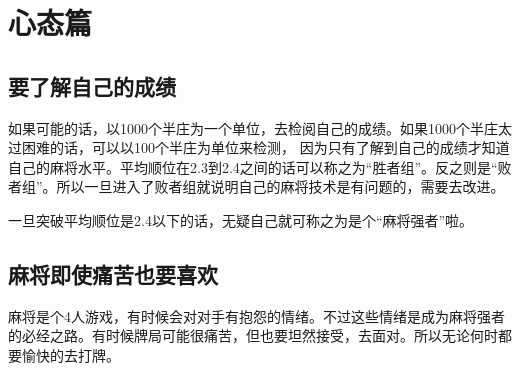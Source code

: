 \documentclass[小V的日麻笔记.tex]{subfiles}
\begin{document}
\chapter{心态篇}
\section{要了解自己的成绩}
如果可能的话，以1000个半庄为一个单位，去检阅自己的成绩。如果1000个半庄太过困难的话，可以以100个半庄为单位来检测， 因为只有了解到自己的成绩才知道自己的麻将水平。平均顺位在2.3到2.4之间的话可以称之为“胜者组”。反之则是“败者组”。所以一旦进入了败者组就说明自己的麻将技术是有问题的，需要去改进。

一旦突破平均顺位是2.4以下的话，无疑自己就可称之为是个“麻将强者”啦。

\section{麻将即使痛苦也要喜欢}
麻将是个4人游戏，有时候会对对手有抱怨的情绪。不过这些情绪是成为麻将强者的必经之路。有时候牌局可能很痛苦，但也要坦然接受，去面对。所以无论何时都要愉快的去打牌。
\end{document}

